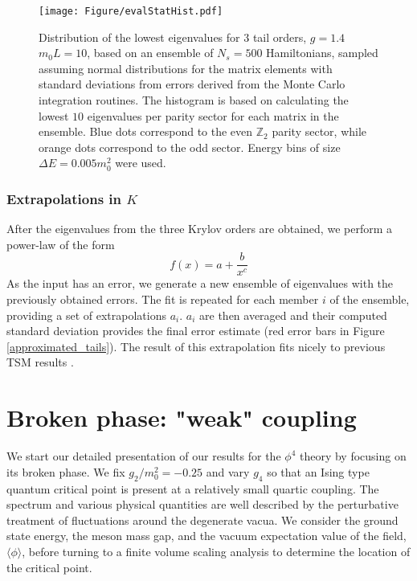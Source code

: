 \documentclass[twocolumn,secnumarabic,amssymb, nobibnotes, aps, prd]{revtex4-2}
\newcommand{\be}{\begin{equation}}
\newcommand{\ee}{\end{equation}}
\begin{document}
\begin{figure}[h]
    \centering
 \texttt{[image: Figure/evalStatHist.pdf]}%

    \caption{
   Distribution of the lowest eigenvalues for $3$ tail orders, $g=1.4$ $m_0L=10$, based on an ensemble of $N_s=500$ Hamiltonians, sampled assuming normal distributions for the matrix elements with standard deviations from errors derived from the Monte Carlo integration routines. The histogram is based on calculating the lowest $10$ eigenvalues per parity sector for each matrix in the ensemble. Blue dots correspond to the even $\mathbb{Z}_2$ parity sector, while orange dots correspond to the odd sector. Energy bins of size $\Delta E=0.005m_0^2$ were used. }
    \label{FigEvalStats}
\end{figure}

\subsubsection{Extrapolations in $K$} \label{Extrap1Sec}

After the eigenvalues from the three Krylov orders are obtained, we perform a power-law of the form
\be
f(x)=a+\frac{b}{x^c} \label{ExpolFunc}
\ee
As the input has an error, we generate a new ensemble of eigenvalues with the previously obtained errors. The fit is repeated for each member $i$ of the ensemble, providing a set of extrapolations $a_i$. $a_i$ are then averaged and their computed standard deviation provides the final error estimate (red error bars in Figure \ref{approximated_tails}). The result of this extrapolation fits nicely to previous TSM results \cite{Elias-Miro:2017tup}.


\section{Broken phase: "weak" coupling}

We start our detailed presentation of our results for the $\phi^4$ theory by focusing on its broken phase. We fix $g_2/m_0^2=-0.25$ and vary $g_4$ so that an Ising type quantum critical point is present at a relatively small quartic coupling. The spectrum and various physical quantities are well described by the perturbative treatment of fluctuations around the degenerate vacua. We consider the ground state energy, the meson mass gap, and the vacuum expectation value of the field, $\langle \phi \rangle$, before turning to a finite volume scaling analysis to determine the location of the critical point.
\end{document}
